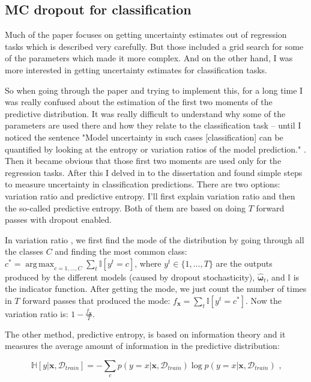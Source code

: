 \documentclass[11pt]{article}
\DeclareMathOperator*{\argmax}{arg\,max}
\begin{document}
\subsection*{MC dropout for classification}

Much of the paper \cite{gal2016dropout} focuses on getting uncertainty estimates out of regression tasks which is described very carefully. But those included a grid search for some of the parameters which made it more complex. And on the other hand, I was more interested in getting uncertainty estimates for classification tasks.

So when going through the paper and trying to implement this, for a long time I was really confused about the estimation of the first two moments of the predictive distribution. It was really difficult to understand why some of the parameters are used there and how they relate to the classification task -- until I noticed the sentence "Model uncertainty in such cases [classification] can be quantified by looking at the entropy or variation ratios of the model prediction." \cite{gal2016dropout}. Then it became obvious that those first two moments are used only for the regression tasks. After this I delved in to the dissertation \cite{gal2016uncertainty} and found simple steps to measure uncertainty in classification predictions. There are two options: variation ratio and predictive entropy. I'll first explain variation ratio and then the so-called predictive entropy. Both of them are based on doing $T$ forward passes with dropout enabled.

In variation ratio \cite{gal2016uncertainty}, we first find the mode of the distribution by going through all the classes $C$ and finding the most common class: $c^{*} = \argmax_{c=1,\ldots,C} \sum_{t} \mathbb{I}[y^t = c]$, where $y^t \in \{ 1, \ldots, T \}$ are the outputs produced by the different models (caused by dropout stochasticity), $\mathbf{\hat{\omega}}_t$, and $\mathbb{I}$ is the indicator function. After getting the mode, we just count the number of times in $T$ forward passes that produced the mode: $f_\mathbf{x} = \sum_{t} \mathbb{I}[y^t = c^{*}]$. Now the variation ratio is: $1 - \frac{f_\mathbf{x}}{T}$.

The other method, predictive entropy, \cite{gal2016uncertainty} is based on information theory and it measures the average amount of information in the predictive distribution:

\[
    \mathbb{H}[y|\mathbf{x}, \mathcal{D}_{train}] = -\sum_{c}p(y = x|\mathbf{x}, \mathcal{D}_{train}) \log p(y = x|\mathbf{x}, \mathcal{D}_{train}) \text{ ,}
\]
\end{document}
